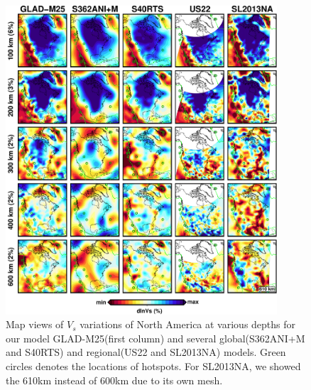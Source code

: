 \documentclass[extra,mreferee]{gji}
\begin{document}
\begin{figure}
\centering
\includegraphics[width=0.9\textwidth]{figures/depth_slice/america_vs.pdf}
  \caption{Map views of $V_s$ variations of North America at various depths for our model GLAD-M25(first column) and several global(S362ANI+M and S40RTS) and regional(US22\citep{zhu2017radial} and SL2013NA\citep{schaeffer2014imaging}) models. Green circles denotes the locations of hotspots. For SL2013NA, we showed the 610km instead of 600km due to its own mesh.}
\label{fig:global-vp}

\end{figure}
\end{document}

